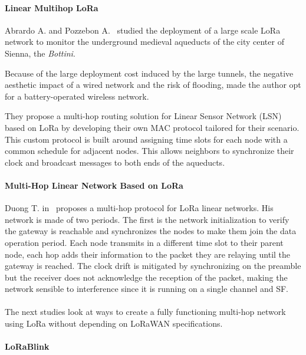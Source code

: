 \paragraph{Linear Multihop LoRa}

Abrardo A. and Pozzebon A.~\cite{Abrardo_2019} studied the deployment of a
large scale LoRa network to monitor the underground medieval aqueducts of the city center 
of Sienna, the \emph{Bottini}.

Because of the large deployment cost induced by the large tunnels, the negative 
aesthetic impact of a wired network and the risk of flooding, made the author
opt for a battery-operated wireless network.


They propose a multi-hop routing solution for Linear Sensor Network (LSN) based 
on LoRa by developing their own MAC protocol tailored for their scenario.
This custom protocol is built around assigning time slots for each node with
a common schedule for adjacent nodes.
This allows neighbors to synchronize their clock and broadcast messages to
both ends of the aqueducts.


\paragraph{Multi-Hop Linear Network Based on LoRa}

Duong T. in~\cite{duong2018} proposes a multi-hop protocol for LoRa linear
networks. 
His network is made of two periods. The first is the network initialization to
verify the gateway is reachable and synchronizes the nodes to make them join the 
data operation period.
Each node transmits in a different time slot to their parent node, each hop adds
their information to the packet they are relaying until the gateway is
reached.
The clock drift is mitigated by synchronizing on the preamble but the receiver
does not acknowledge the reception of the packet, making the network sensible to
interference since it is running on a single channel and SF.

\paragraph{}

The next studies look at ways to create a fully functioning multi-hop network
using LoRa without depending on LoRaWAN specifications.

\paragraph{LoRaBlink}

